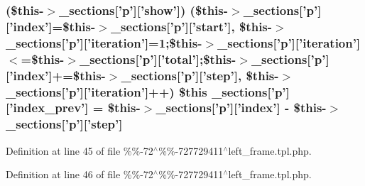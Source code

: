 {{{{{{{{{{{\subsubsection[{\-\_\-sections}]{ (\$this-\/$>${\bf \-\_\-sections}\mbox{[}'p'\mbox{]}\mbox{[}'show'\mbox{]}) (\$this-\/$>${\bf \-\_\-sections}\mbox{[}'p'\mbox{]}\mbox{[}'index'\mbox{]}=\$this-\/$>${\bf \-\_\-sections}\mbox{[}'p'\mbox{]}\mbox{[}'start'\mbox{]}, \$this-\/$>${\bf \-\_\-sections}\mbox{[}'p'\mbox{]}\mbox{[}'iteration'\mbox{]}=1;\$this-\/$>${\bf \-\_\-sections}\mbox{[}'p'\mbox{]}\mbox{[}'iteration'\mbox{]}$<$=\$this-\/$>${\bf \-\_\-sections}\mbox{[}'p'\mbox{]}\mbox{[}'total'\mbox{]};\$this-\/$>${\bf \-\_\-sections}\mbox{[}'p'\mbox{]}\mbox{[}'index'\mbox{]}+=\$this-\/$>${\bf \-\_\-sections}\mbox{[}'p'\mbox{]}\mbox{[}'step'\mbox{]}, \$this-\/$>${\bf \-\_\-sections}\mbox{[}'p'\mbox{]}\mbox{[}'iteration'\mbox{]}++) \$this {\bf \-\_\-sections}\mbox{[}'p'\mbox{]}\mbox{[}'index\-\_\-prev'\mbox{]} = \$this-\/$>${\bf \-\_\-sections}\mbox{[}'p'\mbox{]}\mbox{[}'index'\mbox{]} -\/ \$this-\/$>${\bf \-\_\-sections}\mbox{[}'p'\mbox{]}\mbox{[}'step'\mbox{]}}}\label{_06_06-72_05_06_06-727729411_05left__frame_8tpl_8php_ae3518934be296cfd855fa76350ecae24}


\-Definition at line 45 of file \%\%-\/72$^\wedge$\%\%-\/727729411$^\wedge$left\-\_\-frame.\-tpl.\-php.

\hypertarget{_06_06-72_05_06_06-727729411_05left__frame_8tpl_8php_a12e484db2ccd39a02dc1d3629356880e}{
\index{\-\_\-sections@{\-\_\-sections}!%
\subsubsection[{\-\_\-sections}]{\setlength{\rightskip}{0pt plus 5cm}\$this {\bf \-\_\-sections}\mbox{[}'p'\mbox{]}\mbox{[}'index\-\_\-next'\mbox{]} = \$this-\/$>${\bf \-\_\-sections}\mbox{[}'p'\mbox{]}\mbox{[}'index'\mbox{]} + \$this-\/$>${\bf \-\_\-sections}\mbox{[}'p'\mbox{]}\mbox{[}'step'\mbox{]}}}\label{_06_06-72_05_06_06-727729411_05left__frame_8tpl_8php_a12e484db2ccd39a02dc1d3629356880e}


\-Definition at line 46 of file \%\%-\/72$^\wedge$\%\%-\/727729411$^\wedge$left\-\_\-frame.\-tpl.\-php.

}}}}}}}}}}}
